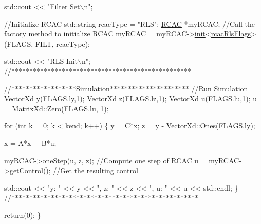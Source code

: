 \begin{DoxyCode}
    std::cout << \textcolor{stringliteral}{"Filter Set\(\backslash\)n"}; 

    \textcolor{comment}{//Initialize RCAC}
    std::string rcacType = \textcolor{stringliteral}{"RLS"};
    \hyperlink{class_r_c_a_c}{RCAC} *myRCAC;
    \textcolor{comment}{//Call the factory method to initialize RCAC}
    myRCAC = myRCAC->\hyperlink{class_r_c_a_c_af7b7133b676886d5010be725291c1a1d}{init}<\hyperlink{structrcac_rls_flags}{rcacRlsFlags}>(FLAGS, FILT, rcacType);

    std::cout << \textcolor{stringliteral}{"RLS Init\(\backslash\)n"}; 
    \textcolor{comment}{//**************************************************}


    \textcolor{comment}{//******************Simulation**********************}
    \textcolor{comment}{//Run Simulation}
    VectorXd y(FLAGS.ly,1);
    VectorXd z(FLAGS.lz,1);
    VectorXd u(FLAGS.lu,1);
    u = MatrixXd::Zero(FLAGS.lu, 1);

    \textcolor{keywordflow}{for} (\textcolor{keywordtype}{int} k = 0; k < kend; k++)
    \{
        y = C*x;
        z = y - VectorXd::Ones(FLAGS.ly);

        x = A*x + B*u;        

        myRCAC->\hyperlink{class_r_c_a_c_a956bb6a557f050d3808d5392fd3add20}{oneStep}(u, z, z); \textcolor{comment}{//Compute one step of RCAC}
        u = myRCAC->\hyperlink{class_r_c_a_c_ad93e5753d1810d7c3b2f6fbf56857a51}{getControl}(); \textcolor{comment}{//Get the resulting control}

        std::cout << \textcolor{stringliteral}{"y: "} << y << \textcolor{stringliteral}{", z: "} << z << \textcolor{stringliteral}{", u: "} << u << std::endl;
    \}
    \textcolor{comment}{//****************************************************}

    \textcolor{keywordflow}{return}(0);
\}
\end{DoxyCode}
 